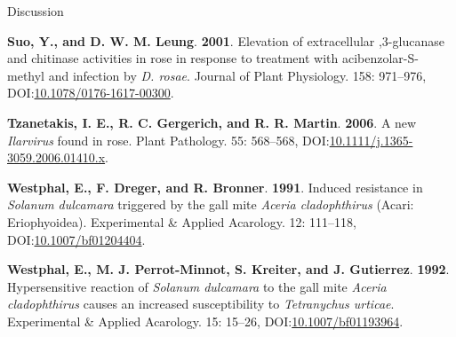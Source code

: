 \documentclass[
  ignorenonframetext,
]{beamer}
\newlength{\cslhangindent}
\newlength{\cslentryspacingunit} %
\newenvironment{CSLReferences}[2] %
 {%
  \setlength{\parindent}{0pt}
  \ifodd #1
  \let\oldpar\par
  \def\par{\hangindent=\cslhangindent\oldpar}
  \fi
  \setlength{\parskip}{#2\cslentryspacingunit}
 }%
 {}
\begin{document}
\begin{frame}{Discussion}
\begin{CSLReferences}{1}{0}
\leavevmode{}%
\textbf{Suo, Y., and D. W. M. Leung}. \textbf{2001}. Elevation of
extracellular ,3-glucanase and chitinase activities in rose
in response to treatment with acibenzolar-{S}-methyl and infection by
{\emph{D. rosae}}. Journal of Plant Physiology. 158: 971--976,
DOI:\href{https://doi.org/10.1078/0176-1617-00300}{10.1078/0176-1617-00300}.

\leavevmode{}%
\textbf{Tzanetakis, I. E., R. C. Gergerich, and R. R. Martin}.
\textbf{2006}. A new {\emph{Ilarvirus}} found in rose. Plant Pathology.
55: 568--568,
DOI:\href{https://doi.org/10.1111/j.1365-3059.2006.01410.x}{10.1111/j.1365-3059.2006.01410.x}.

\leavevmode{}%
\textbf{Westphal, E., F. Dreger, and R. Bronner}. \textbf{1991}. Induced
resistance in {\emph{Solanum dulcamara}} triggered by the gall mite
{\emph{Aceria cladophthirus}} ({Acari}: {Eriophyoidea}). Experimental
{\&} Applied Acarology. 12: 111--118,
DOI:\href{https://doi.org/10.1007/bf01204404}{10.1007/bf01204404}.

\leavevmode{}%
\textbf{Westphal, E., M. J. Perrot-Minnot, S. Kreiter, and J.
Gutierrez}. \textbf{1992}. Hypersensitive reaction of {\emph{Solanum
dulcamara}} to the gall mite {\emph{Aceria cladophthirus}} causes an
increased susceptibility to {\emph{Tetranychus urticae}}. Experimental
{\&} Applied Acarology. 15: 15--26,
DOI:\href{https://doi.org/10.1007/bf01193964}{10.1007/bf01193964}.

\end{CSLReferences}
\end{frame}
\end{document}
